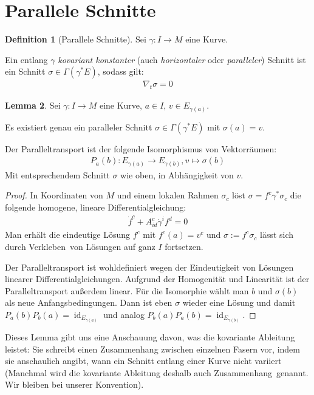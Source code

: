 \documentclass[a4paper]{scrreprt}
\numberwithin{equation}{chapter}
\DeclareMathOperator{\id}{id}
\theoremstyle{definition}
\newtheorem{defn}{Definition}[section]
\newtheorem{lemma}[defn]{Lemma}
\begin{document}
	\section{Parallele Schnitte}
		\begin{defn}[Parallele Schnitte]
			Sei $\gamma\colon I\rightarrow M$ eine Kurve.
			
			Ein entlang $\gamma$ \emph{kovariant konstanter} (auch \emph{horizontaler} oder \emph{paralleler}) Schnitt ist ein Schnitt $\sigma\in\Gamma(\gamma^*E)$, sodass gilt:
			\begin{align*}
				\nabla_t\sigma=0
			\end{align*}
		\end{defn}
		\begin{lemma}
			Sei $\gamma\colon I\rightarrow M$ eine Kurve, $a\in I$, $v\in E_{\gamma(a)}$.
			
			Es existiert genau ein paralleler Schnitt $\sigma\in \Gamma(\gamma^*E)$ mit $\sigma(a)=v$.
			
			Der Paralleltransport ist der folgende Isomorphismus von Vektorräumen:
			\begin{align*}
				P_{a}(b)\colon E_{\gamma(a)}\rightarrow E_{\gamma(b)}, v\mapsto \sigma(b)
			\end{align*}
			Mit entsprechendem Schnitt $\sigma$ wie oben, in Abhängigkeit von $v$.
			\begin{proof}
				In Koordinaten von $M$ und einem lokalen Rahmen $\sigma_c$ löst $\sigma=f^c\gamma^*\sigma_c$ die folgende homogene, lineare Differentialgleichung:
				\begin{align*}
					\dot{f}^c+A^c_{id}\dot{\gamma}^i f^d=0
				\end{align*}
				Man erhält die eindeutige Lösung $f^c$ mit $f^c(a)=v^c$ und $\sigma:=f^c\sigma_c$ lässt sich durch \glqq Verkleben\grqq\ von Lösungen auf ganz $I$ fortsetzen.
				
				Der Paralleltransport ist wohldefiniert wegen der Eindeutigkeit von Lösungen linearer Differentialgleichungen. Aufgrund der Homogenität und Linearität ist der Paralleltransport außerdem linear. Für die Isomorphie wählt man $b$ und $\sigma(b)$ als neue Anfangsbedingungen. Dann ist eben $\sigma$ wieder eine Lösung und damit $P_a(b)P_b(a)=\id_{E_{\gamma(a)}}$ und analog $P_b(a)P_a(b)=\id_{E_{\gamma(b)}}$.
			\end{proof}
		\end{lemma}
		Dieses Lemma gibt uns eine Anschauung davon, was die kovariante Ableitung leistet: Sie schreibt einen Zusammenhang zwischen einzelnen Fasern vor, indem sie anschaulich angibt, wann ein Schnitt entlang einer Kurve nicht variiert (Manchmal wird die kovariante Ableitung deshalb auch \glqq Zusammenhang\grqq\ genannt. Wir bleiben bei unserer Konvention).
		
\end{document}
